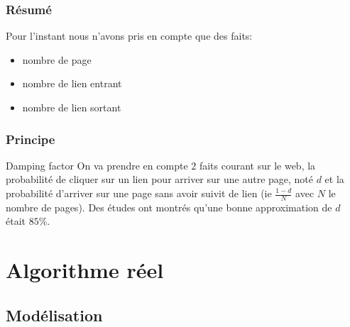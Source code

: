 \documentclass{beamer}
\begin{document}
\begin{frame}
  \tableofcontents[currentsection,subsectionstyle=hide]
\end{frame}

\begin{frame}
  \frametitle{Résumé}

  Pour l'instant nous n'avons pris en compte que des faits:\\
  
  \begin{itemize}
    \item nombre de page
      \pause
    \item nombre de lien entrant
      \pause
    \item nombre de lien sortant
  \end{itemize}

\end{frame}

\begin{frame}
  \frametitle{Principe}

  \begin{block}{Damping factor}
    On va prendre en compte 2 faits courant sur le web, la probabilité
    de cliquer sur un lien pour arriver sur une autre page, noté $d$ et
    la probabilité d'arriver sur une page sans avoir suivit de lien (ie
    $\frac{1 - d}{N}$ avec $N$ le nombre de pages). Des études ont
    montrés qu'une bonne approximation de $d$ était $85\%$.
  \end{block}
\end{frame}

\section{Algorithme réel}
\subsection{Modélisation}

\begin{frame}
  \tableofcontents[currentsection,subsectionstyle=hide]
\end{frame}
\end{document}

